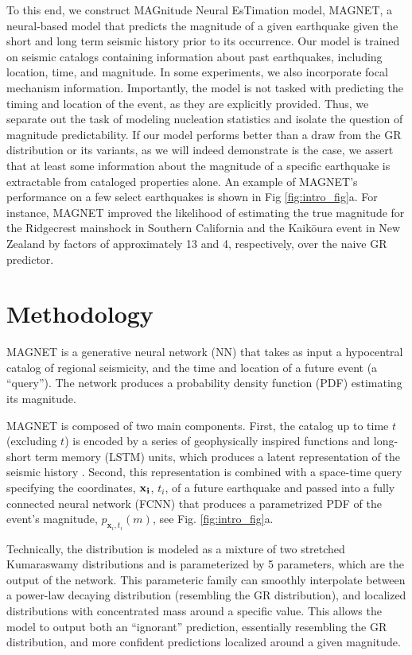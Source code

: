 \documentclass[pdflatex]{sn-jnl}
\begin{document}
To this end, we construct MAGnitude Neural EsTimation model, \nobreak MAGNET, a neural-based model that predicts the magnitude of a given earthquake given the short and long term seismic history prior to its occurrence. Our model is trained on seismic catalogs containing information about past earthquakes, including location, time, and magnitude. In some experiments, we also incorporate focal mechanism information.
Importantly, the model is not tasked with predicting the timing and location of the event, as they are explicitly provided.
Thus, we separate out the task of modeling nucleation statistics and isolate the question of magnitude predictability.
If our model performs better than a draw from the GR distribution or its variants, as we will indeed demonstrate is the case, we assert that at least some information about the magnitude of a specific earthquake is extractable from cataloged properties alone. 
An example of MAGNET's performance on a few select earthquakes is shown in Fig \ref{fig:intro_fig}a. For instance, MAGNET improved the likelihood of estimating the true magnitude for the Ridgecrest mainshock in Southern California and the Kaikōura event in New Zealand by factors of approximately 13 and 4, respectively, over the naive GR predictor.

\section{Methodology}
MAGNET is a generative neural network (NN) that takes as input a hypocentral catalog of regional seismicity, and the time and location of a future event (a ``query''). The network produces a probability density function (PDF) estimating its magnitude. 

MAGNET is composed of two main components. First, the catalog up to time $t$ (excluding $t$) is encoded by a series of geophysically inspired functions and long-short term memory (LSTM) units, which produces a latent representation of the seismic history \cite{hochreiter_long_1997}.
Second, this representation is combined with a space-time query specifying the coordinates, $\bf{x}_i$, $t_i$, of a future earthquake and passed into a fully connected neural network (FCNN) that produces a parametrized PDF of the event's magnitude, $p_{\textbf{x}_i, t_i}(m)$, see Fig. \ref{fig:intro_fig}a. 

Technically, the distribution is modeled as a mixture of two stretched Kumaraswamy distributions \cite{kumaraswamy_generalized_1980} and is parameterized by 5 parameters, which are the output of the network. This parameteric family can  smoothly interpolate between a power-law decaying distribution (resembling the GR distribution), and localized distributions with concentrated mass around a specific value. This allows the model to output both an ``ignorant'' prediction, essentially resembling the GR distribution, and more confident predictions localized around a given magnitude.
\end{document}
